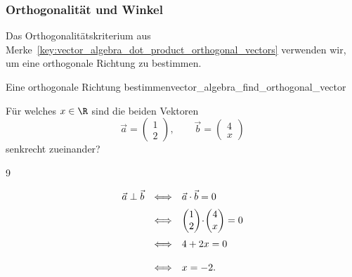\subsubsection{Orthogonalität und Winkel}
\label{subsubsec:vector_algebra_orthogonality_angles}

Das Orthogonalitätskriterium aus
Merke~\ref{key:vector_algebra_dot_product_orthogonal_vectors} verwenden wir,
um eine orthogonale Richtung zu bestimmen.

\begin{ExampleBox}{Eine orthogonale Richtung bestimmen}{vector_algebra_find_orthogonal_vector}
  \noindent
  \begin{minipage}[c]{0.57\linewidth}
    Für welches $x\in\R$ sind die beiden Vektoren
    \[
      \vec a=\begin{pmatrix}1\\2\end{pmatrix},
      \qquad
      \vec b=\begin{pmatrix}4\\x\end{pmatrix}
    \]
    senkrecht zueinander?
    \begin{ClozeArea}[20]{9}
      \[
        \begin{array}{@{}rcl@{}}
          \vphantom{\begin{pmatrix}1\\2\end{pmatrix}}\vec a\perp\vec b
          &\Longleftrightarrow& \vec a\cdot\vec b=0\\[0.5em]
          \vphantom{\begin{pmatrix}1\\2\end{pmatrix}}
          &\Longleftrightarrow&
            \begin{pmatrix}1\\2\end{pmatrix}\!\cdot\!
            \begin{pmatrix}4\\x\end{pmatrix}=0\\[0.5em]
          \vphantom{\begin{pmatrix}1\\2\end{pmatrix}}
          &\Longleftrightarrow& 4+2x=0\\[0.5em]
          \vphantom{\begin{pmatrix}1\\2\end{pmatrix}}
          &\Longleftrightarrow& x=-2.
        \end{array}
      \]
    \end{ClozeArea}
  \end{minipage}\hfill
  \begin{minipage}[c]{0.39\linewidth}
    \centering
  \end{minipage}
\end{ExampleBox}

